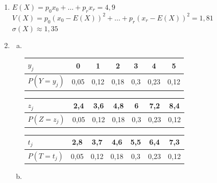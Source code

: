 \documentclass[12pt, a4paper]{article}
\begin{document}
    \begin{Exercise}[number={51}]
      \begin{enumerate}[1)]
        \item $E(X)=p_0x_0+\dots+p_rx_r=4{,}9$ \\ $V(X)=p_0(x_0-E(X))^2+\dots+p_r(x_r-E(X))^2=1{,}81$ \\ $\sigma(X)\approx 1{,}35$
        \item \begin{enumerate}[a)]
              \item \ \begin{center}\begin{tabular}{ | l | *{6}{c|} }
                      \hline
                      $y_j$                     & 0      & 1      & 2      & 3     & 4      & 5      \\ \hline
                      $P(Y=y_j)$ \hspace{0.5cm} & 0{,}05 & 0{,}12 & 0{,}18 & 0{,}3 & 0{,}23 & 0{,}12 \\ \hline
                    \end{tabular}\end{center}
                    \begin{center}\begin{tabular}{ | l | *{6}{c|} }
                      \hline
                      $z_j$                     & 2{,}4  & 3{,}6  & 4{,}8  & 6     & 7{,}2  & 8{,}4  \\ \hline
                      $P(Z=z_j)$ \hspace{0.5cm} & 0{,}05 & 0{,}12 & 0{,}18 & 0{,}3 & 0{,}23 & 0{,}12 \\ \hline
                    \end{tabular}\end{center}
                    \begin{center}\begin{tabular}{ | l | *{6}{c|} }
                      \hline
                      $t_j$                     & 2{,}8  & 3{,}7  & 4{,}6  & 5{,}5 & 6{,}4  & 7{,}3  \\ \hline
                      $P(T=t_j)$ \hspace{0.5cm} & 0{,}05 & 0{,}12 & 0{,}18 & 0{,}3 & 0{,}23 & 0{,}12 \\ \hline
                    \end{tabular}\end{center} \bigbreak
              \item \begin{equation*}

\end{equation*}
\end{enumerate}
\end{enumerate}
\end{Exercise}
\end{document}
